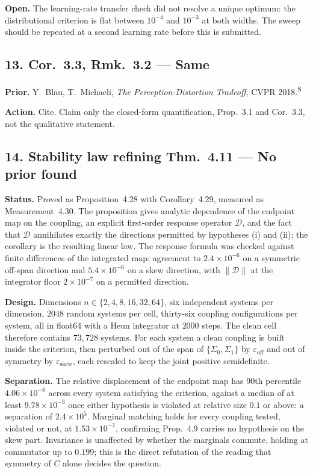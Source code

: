 \documentclass[11pt]{article}
\newcommand{\Sec}{\textsuperscript{S}}
\begin{document}
\textbf{Open.} The learning-rate transfer check did not resolve a unique optimum: the
distributional criterion is flat between $10^{-4}$ and $10^{-3}$ at both widths. The sweep should
be repeated at a second learning rate before this is submitted.

\subsection*{13. Cor.~3.3, Rmk.~3.2 --- Same}

\textbf{Prior.} Y.~Blau, T.~Michaeli, \emph{The Perception-Distortion Tradeoff}, CVPR 2018.\Sec

\textbf{Action.} Cite. Claim only the closed-form quantification, Prop.~3.1 and Cor.~3.3, not the
qualitative statement.

\subsection*{14. Stability law refining Thm.~4.11 --- No prior found}

\textbf{Status.} Proved as Proposition~4.28 with Corollary~4.29, measured as Measurement~4.30.
The proposition gives analytic dependence of the endpoint map on the coupling, an explicit
first-order response operator $\mathcal D$, and the fact that $\mathcal D$ annihilates exactly the
directions permitted by hypotheses (i) and (ii); the corollary is the resulting linear law. The
response formula was checked against finite differences of the integrated map: agreement to
$2.4\times10^{-6}$ on a symmetric off-span direction and $5.4\times10^{-6}$ on a skew direction,
with $\|\mathcal D\|$ at the integrator floor $2\times10^{-7}$ on a permitted direction.

\textbf{Design.} Dimensions $n\in\{2,4,8,16,32,64\}$, six independent systems per dimension,
$2048$ random systems per cell, thirty-six coupling configurations per system, all in float64 with
a Heun integrator at $2000$ steps. The clean cell therefore contains $73{,}728$ systems. For each
system a clean coupling is built inside the criterion, then perturbed out of the span of
$\{\Sigma_0,\Sigma_1\}$ by $\varepsilon_{\mathrm{off}}$ and out of symmetry by
$\varepsilon_{\mathrm{skew}}$, each rescaled to keep the joint positive semidefinite.

\textbf{Separation.} The relative displacement of the endpoint map has $90$th percentile
$4.06\times10^{-8}$ across every system satisfying the criterion, against a median of at least
$9.78\times10^{-3}$ once either hypothesis is violated at relative size $0.1$ or above: a
separation of $2.4\times10^{5}$. Marginal matching holds for every coupling tested, violated or
not, at $1.53\times10^{-7}$, confirming Prop.~4.9 carries no hypothesis on the skew part.
Invariance is unaffected by whether the marginals commute, holding at commutator up to $0.199$;
this is the direct refutation of the reading that symmetry of $C$ alone decides the question.
\end{document}
